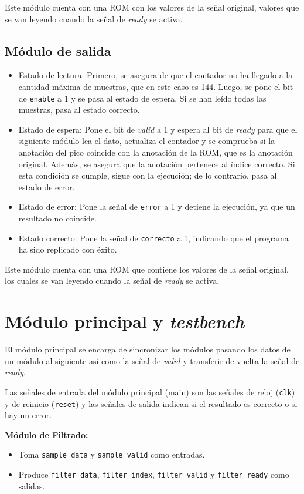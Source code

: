 Este módulo cuenta con una ROM con los valores de la señal original, valores que se van leyendo cuando la señal de \textit{ready} se activa.

\subsection{Módulo de salida}
\begin{itemize}
\item Estado de lectura: Primero, se asegura de que el contador no ha llegado a la cantidad máxima de muestras, que en este caso es 144. Luego, se pone el bit de \texttt{enable} a 1 y se pasa al estado de espera. Si se han leído todas las muestras, pasa al estado correcto.
\item Estado de espera: Pone el bit de \textit{valid} a 1 y espera al bit de \textit{ready} para que el siguiente módulo lea el dato, actualiza el contador y se comprueba si la anotación del pico coincide con la anotación de la ROM, que es la anotación original. Además, se asegura que la anotación pertenece al índice correcto. Si esta condición se cumple, sigue con la ejecución; de lo contrario, pasa al estado de error.
\item Estado de error: Pone la señal de \texttt{error} a 1 y detiene la ejecución, ya que un resultado no coincide.
\item Estado correcto: Pone la señal de \texttt{correcto} a 1, indicando que el programa ha sido replicado con éxito.
\end{itemize}

Este módulo cuenta con una ROM que contiene los valores de la señal original, los cuales se van leyendo cuando la señal de \textit{ready} se activa.
\section{Módulo principal y \textit{testbench}}

El módulo principal se encarga de sincronizar los módulos pasando los datos de un módulo al siguiente así como la señal de \textit{valid} y transferir de vuelta la señal de \textit{ready}.

Las señales de entrada del módulo principal (main) son las señales de reloj (\texttt{clk}) y de reinicio (\texttt{reset}) y las señales de salida indican si el resultado es correcto o si hay un error.

\textbf{Módulo de Filtrado:}
\begin{itemize}
    \item Toma \texttt{sample\_data} y \texttt{sample\_valid} como entradas.
    \item Produce \texttt{filter\_data}, \texttt{filter\_index}, \texttt{filter\_valid} y \texttt{filter\_ready} como salidas.
\end{itemize}

